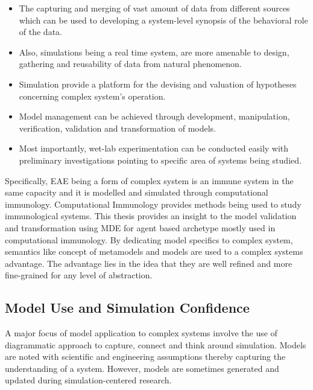 \documentclass[10pt]{article}
\begin{document}
\begin{itemize}

\item The capturing and merging of vast amount of data from different sources which can be used to developing a system-level synopsis of the behavioral role of the data.

\item Also, simulations being a real time system, are more amenable to design, gathering and reusability of data from natural phenomenon.

\item Simulation provide a platform for the devising and valuation of hypotheses concerning complex system’s operation.

\item Model management can be achieved through development, manipulation, verification, validation and transformation of models.

\item Most importantly, wet-lab experimentation can be conducted easily with preliminary investigations pointing to specific area of systems being studied.

\end{itemize}

Specifically, EAE being a form of complex system is an immune system in the same capacity and it is modelled and simulated through computational immunology. Computational Immunology provides methods being used to study immunological systems. This thesis provides an insight to the model validation and transformation using MDE for agent based archetype mostly used in computational immunology. By dedicating model specifics to complex system, semantics like concept of metamodels and models are used to a complex systems advantage. The advantage lies in the idea that they are well refined and more fine-grained for any level of abstraction.

\subsection{Model Use and Simulation Confidence}

A major focus of model application to complex systems involve the use of diagrammatic approach to capture, connect and think around simulation. Models are noted with scientific and engineering assumptions thereby capturing the understanding of a system. However, models are sometimes generated and updated during simulation-centered research. 
\end{document}
